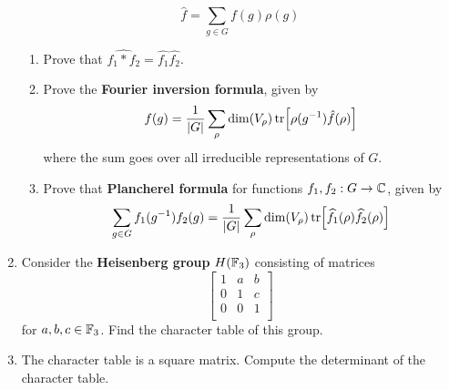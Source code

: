 \documentclass[../psets.tex]{subfiles}
\begin{document}
\begin{enumerate}
    \begin{equation*}
        \hat{f} = \sum_{g\in G}f(g)\rho(g)
    \end{equation*}
    \begin{enumerate}
        \item Prove that $\widehat{f_1*f_2}=\widehat{f_1}\widehat{f_2}$.
        \item Prove the \textbf{Fourier inversion formula}, given by
        \begin{equation*}
            f(g) = \frac{1}{|G|}\sum_\rho\dim(V_\rho)\tr[\rho(g^{-1})\hat{f}(\rho)]
        \end{equation*}
        where the sum goes over all irreducible representations of $G$.
        \item Prove that \textbf{Plancherel formula} for functions $f_1,f_2:G\to\mathbb{C}$, given by
        \begin{equation*}
            \sum_{g\in G}f_1(g^{-1})f_2(g) = \frac{1}{|G|}\sum_\rho\dim(V_\rho)\tr[\widehat{f_1}(\rho)\widehat{f_2}(\rho)]
        \end{equation*}
    \end{enumerate}
    \item Consider the \textbf{Heisenberg group} $H(\mathbb{F}_3)$ consisting of matrices
    \begin{equation*}
        \begin{bmatrix}
            1 & a & b\\
            0 & 1 & c\\
            0 & 0 & 1\\
        \end{bmatrix}
    \end{equation*}
    for $a,b,c\in\mathbb{F}_3$. Find the character table of this group.
    \item The character table is a square matrix. Compute the determinant of the character table.
\end{enumerate}
\end{document}
